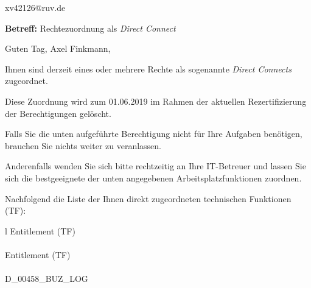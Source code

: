 \documentclass[a4paper,landscape,12pt]{letter}
\begin{document}
\begin{letter}{xv42126@ruv.de\hfill \break}
\begin{normalsize}
	\opening{\textbf{Betreff:} Rechtezuordnung als \emph{Direct Connect}}
	\begin{normalsize} \hfill
	\end{normalsize}

	\begin{normalsize}
		Guten Tag, 
	Axel Finkmann, \hfill \break
	\end{normalsize}
	\end{normalsize}
	
\begin{normalsize}
	Ihnen sind derzeit eines oder mehrere Rechte als sogenannte \emph{Direct Connects} zugeordnet.
	
	Diese Zuordnung wird zum 01.06.2019 im Rahmen der aktuellen Rezertifizierung der Berechtigungen gelöscht.
	
	Falls Sie die unten aufgeführte Berechtigung nicht für Ihre Aufgaben benötigen, 
	brauchen Sie nichts weiter zu veranlassen.
	
	Anderenfalls wenden Sie sich bitte rechtzeitig an Ihre IT-Betreuer 
	und lassen Sie sich die bestgeeignete der unten angegebenen Arbeitsplatzfunktionen zuordnen.
	\end{normalsize}
	
\begin{normalsize}
	Nachfolgend die Liste der Ihnen direkt zugeordneten technischen Funktionen (TF):

	\begin{longtable}{l}
		Entitlement (TF) \\ \hline
		\endfirsthead
		\\\hline
		Entitlement (TF) \\ \hline
		\endhead %
		\multicolumn{1}{r@{}}{Fortsetzung \ldots}\\
		\endfoot
		\hline
		\endlastfoot
	D\_00458\_BUZ\_LOG\\
	\end{longtable}
	\end{normalsize}
	

\end{letter}
\end{document}
